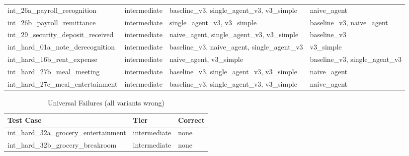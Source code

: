 \begin{table}[htbp]
{\begin{tabular}{l l l l}
  int\_26a\_payroll\_recognition & intermediate & baseline\_v3, single\_agent\_v3, v3\_simple & naive\_agent \\
  int\_26b\_payroll\_remittance & intermediate & single\_agent\_v3, v3\_simple & baseline\_v3, naive\_agent \\
  int\_29\_security\_deposit\_received & intermediate & naive\_agent, single\_agent\_v3, v3\_simple & baseline\_v3 \\
  int\_hard\_01a\_note\_derecognition & intermediate & baseline\_v3, naive\_agent, single\_agent\_v3 & v3\_simple \\
  int\_hard\_16b\_rent\_expense & intermediate & naive\_agent, v3\_simple & baseline\_v3, single\_agent\_v3 \\
  int\_hard\_27b\_meal\_meeting & intermediate & baseline\_v3, single\_agent\_v3, v3\_simple & naive\_agent \\
  int\_hard\_27c\_meal\_entertainment & intermediate & baseline\_v3, single\_agent\_v3, v3\_simple & naive\_agent \\
\bottomrule
\end{tabular}}\end{table}

\begin{table}[htbp]
\centering
\caption{Universal Failures (all variants wrong)}
\label{tab:all-fail}
\begin{tabular}{l l l}
\toprule
Test Case & Tier & Correct \\
\midrule
  int\_hard\_32a\_grocery\_entertainment & intermediate & none \\
  int\_hard\_32b\_grocery\_breakroom & intermediate & none \\
\bottomrule
\end{tabular}
\end{table}
